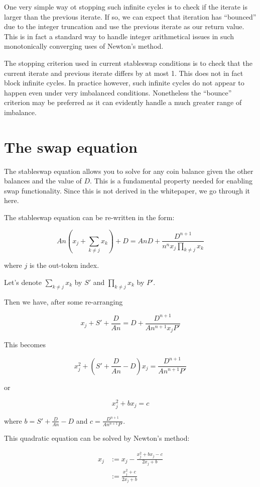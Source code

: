 \documentclass[
]{article}
\begin{document}
One very simple way ot stopping such infinite cycles is to check if the
iterate is larger than the previous iterate. If so, we can expect that
iteration has ``bounced'' due to the integer truncation and use the
previous iterate as our return value. This is in fact a standard way to
handle integer arithmetical issues in such monotonically converging uses
of Newton's method.

The stopping criterion used in current stableswap conditions is to check
that the current iterate and previous iterate differs by at most 1. This
does not in fact block infinite cycles. In practice however, such
infinite cycles do not appear to happen even under very imbalanced
conditions. Nonetheless the ``bounce'' criterion may be preferred as it
can evidently handle a much greater range of imbalance.

\hypertarget{the-swap-equation}{%
\section{The swap equation}\label{the-swap-equation}}

The stableswap equation allows you to solve for any coin balance given
the other balances and the value of \(D\). This is a fundamental
property needed for enabling swap functionality. Since this is not
derived in the whitepaper, we go through it here.

The stableswap equation can be re-written in the form:

\[ An\left(x_j + \sum_{k\neq j} x_k\right) + D = AnD + \frac{D^{n+1}}{n^n x_j \prod_{k\neq j} x_k} \]

where \(j\) is the out-token index.

Let's denote \(\sum_{k\neq j} x_k\) by \(S'\) and
\(\prod_{k\neq j} x_k\) by \(P'\).

Then we have, after some re-arranging

\[ x_j + S' + \frac{D}{An} = D + \frac{D^{n+1}}{An^{n+1} x_j P'} \]

This becomes

\[ x_j^2 + \left(S' + \frac{D}{An} - D\right) x_j = \frac{D^{n+1}}{An^{n+1}P'}\]

or

\[ x_j^2 + bx_j = c\]

where \(b = S' + \frac{D}{An} - D\) and
\(c = \frac{D^{n+1}}{An^{n+1}P'}\).

This quadratic equation can be solved by Newton's method:

\[ \begin{aligned}
x_j &:= x_j - \frac{x_j^2 + bx_j - c}{2x_j + b}\\
&:= \frac{x_j^2 + c}{2x_j + b} \\
\end{aligned} \]
\end{document}
